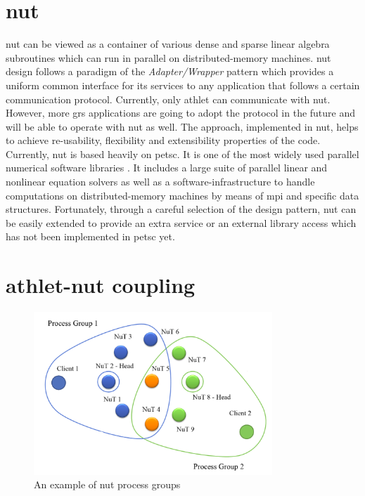 \section{\acrshort{nut}}

\acrfull{nut} can be viewed as a container of various dense and sparse linear algebra subroutines which can run in parallel on distributed-memory machines. \acrshort{nut} design follows a paradigm of the \textit{Adapter/Wrapper} pattern which provides a uniform common interface for its services to any application that follows a certain communication protocol. Currently, only \acrshort{athlet} can communicate with \acrshort{nut}. However, more \acrshort{grs} applications are going to adopt the protocol in the future and will be able to operate with \acrshort{nut} as well. The approach, implemented in \acrshort{nut}, helps to achieve re-usability, flexibility and extensibility properties of the code.\\


Currently, \acrshort{nut} is based heavily on \acrfull{petsc}. It is one of the most widely used parallel numerical software  libraries \cite{wiki:petsc-general-info}. It includes a large suite of parallel linear and nonlinear equation solvers as well as a software-infrastructure to handle computations on distributed-memory machines by means of  \acrfull{mpi} and specific data structures. Fortunately, through a careful selection of the design pattern, \acrshort{nut} can be easily extended to provide an extra service or an external library access which has not been implemented in \acrshort{petsc} yet.\\ 


\section{\acrshort{athlet}-\acrshort{nut} coupling}
\label{sec:athlet-nut-coupling}

\figpointer{\ref{fig:introduction-nut-process-groups}}
\begin{figure}[htpb]
  \centering
  \includegraphics[width=0.8\textwidth]{figures/introduction-nut-process-groups.png}
\caption{An example of \acrshort{nut} process groups}
\label{fig:introduction-nut-process-groups}
\end{figure}

